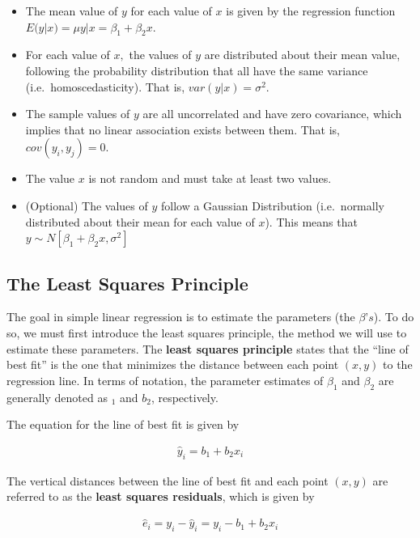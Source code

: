 \documentclass[
]{book}
\providecommand{\tightlist}{%
  \setlength{\itemsep}{0pt}\setlength{\parskip}{0pt}}
\begin{document}
\begin{itemize}
\tightlist
\item
  The mean value of \(y\) for each value of \(x\) is given by the regression function \(E(y|x)=\mu y|x=\beta_1+\beta_2x.\)
\item
  For each value of \(x,\) the values of \(y\) are distributed about their mean value, following the probability distribution that all have the same variance (i.e.~homoscedasticity). That is, \(var(y|x)=\sigma^2.\)
\item
  The sample values of \(y\) are all uncorrelated and have zero covariance, which implies that no linear association exists between them. That is, \(cov(y_i,y_j)=0.\)
\item
  The value \(x\) is not random and must take at least two values.
\item
  (Optional) The values of \(y\) follow a Gaussian Distribution (i.e.~normally distributed about their mean for each value of \(x\)). This means that \(y∼N[\beta_1+\beta_2x,\sigma^2]\)
\end{itemize}

\hypertarget{the-least-squares-principle}{%
\subsection{The Least Squares Principle}\label{the-least-squares-principle}}

The goal in simple linear regression is to estimate the parameters (the \(\beta’s\)). To do so, we must first introduce the least squares principle, the method we will use to estimate these parameters. The \textbf{least squares principle} states that the ``line of best fit'' is the one that minimizes the distance between each point \((x,y)\) to the regression line. In terms of notation, the parameter estimates of \(\beta_1\) and \(\beta_2\) are generally denoted as \(_1\) and \(b_2\), respectively.

The equation for the line of best fit is given by

\[
\begin{aligned}
\hat{y}_i=b_1+b_2x_i
\end{aligned}
\]

The vertical distances between the line of best fit and each point \((x,y)\) are referred to as the \textbf{least squares residuals}, which is given by

\[
\begin{aligned}
\hat{e}_i=y_i−\hat{y}_i=y_i−b_1+b_2x_i
\end{aligned}
\]
\end{document}
